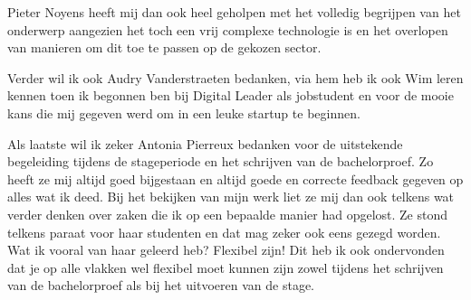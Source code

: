 Pieter Noyens heeft mij dan ook heel geholpen met het volledig begrijpen van het onderwerp aangezien het toch een vrij complexe technologie is en het overlopen van manieren om dit toe te passen op de gekozen sector. 

Verder wil ik ook Audry Vanderstraeten bedanken, via hem heb ik ook Wim leren kennen toen ik begonnen ben bij Digital Leader als jobstudent en voor de mooie kans die mij gegeven werd om in een leuke startup te beginnen.

Als laatste wil ik zeker Antonia Pierreux bedanken voor de uitstekende begeleiding tijdens de stageperiode en het schrijven van de bachelorproef. Zo heeft ze mij altijd goed bijgestaan en altijd goede en correcte feedback gegeven op alles wat ik deed. Bij het bekijken van mijn werk liet ze mij dan ook telkens wat verder denken over zaken die ik op een bepaalde manier had opgelost. Ze stond telkens paraat voor haar studenten en dat mag zeker ook eens gezegd worden. Wat ik vooral van haar geleerd heb? Flexibel zijn! Dit heb ik ook ondervonden dat je op alle vlakken wel flexibel moet kunnen zijn zowel tijdens het schrijven van de bachelorproef als bij het uitvoeren van de stage.